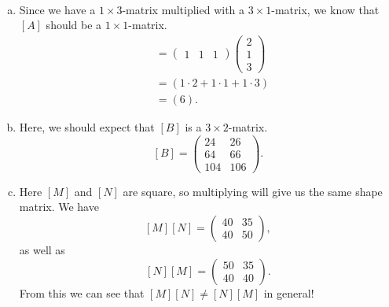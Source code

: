 \documentclass[12pt]{article} %
\begin{document}
\begin{solution}~
\begin{enumerate}[(a)]
    \item Since we have a $1\times 3$-matrix multiplied with a $3\times 1$-matrix, we know that $[A]$ should be a $1\times 1$-matrix.
    \begin{align*}
    [A]&=\begin{pmatrix} 1 & 1 & 1 \end{pmatrix} \begin{pmatrix} 2 \\ 1 \\ 3 \end{pmatrix}\\
    &= (1\cdot 2 + 1 \cdot 1 + 1 \cdot 3)\\
    &= (6).
    \end{align*}
    \item Here, we should expect that $[B]$ is a $3\times 2$-matrix.
    \[
    [B] = \begin{pmatrix} 24 & 26 \\ 64 & 66 \\ 104 & 106 \end{pmatrix}.
    \]
    \item Here $[M]$ and $[N]$ are square, so multiplying will give us the same shape matrix.  We have
    \[
    [M][N] = \begin{pmatrix} 40 & 35 \\ 40 & 50 \end{pmatrix},
    \]
    as well as
    \[
    [N][M] = \begin{pmatrix} 50 & 35 \\ 40 & 40 \end{pmatrix}.
    \]
    From this we can see that $[M][N]\neq [N][M]$ in general!
\end{enumerate}
\end{solution}
\end{document}
